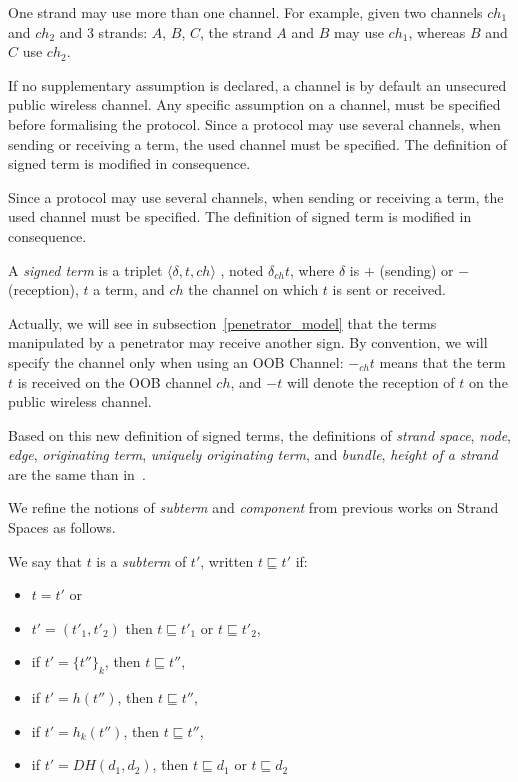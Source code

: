 One strand may use more than one channel.
For example, given two channels $ch_1$ and $ch_2$ and 3 strands: $A$, $B$, $C$, the strand $A$ and $B$ may use $ch_1$, whereas $B$ and $C$ use $ch_2$. 

If no supplementary assumption is declared, a channel is by default an unsecured public wireless channel. Any specific assumption on a channel, must be specified before formalising the protocol. Since a protocol may use several channels, when sending or receiving a term, the used channel must be specified. The definition of signed term is modified in consequence. 

Since a protocol may use several channels, when sending or receiving a term, the used channel must be specified. The definition of signed term is modified in consequence. 

\begin{Definition}
A \emph{signed term} is a triplet $\langle \delta, t, ch  \rangle$ , noted $\delta_{ch} t$, where $\delta$ is $+$ (sending) or $-$ (reception), $t$ a term, and $ch$ the channel on which $t$ is sent or received.
\end{Definition}

Actually, we will see in subsection~\ref{penetrator_model} that the terms manipulated by a penetrator may receive another sign.
By convention, we will specify the channel only when using an OOB Channel: $-_{ch}t$ means that the term $t$ is received on the OOB channel $ch$, and $-t$ will denote the reception of $t$ on the public wireless channel.

Based on this new definition of signed terms, the definitions of \textit{strand space}, \textit{node}, \textit{edge}, \textit{originating term}, \textit{uniquely originating term}, and \textit{bundle}, \textit{height of a strand} are the same than in~\cite{674832}. 

We refine the notions of \textit{subterm} and \textit{component} from previous works on Strand Spaces as follows.

\begin{Definition}[Subterm]
We say that $t$ is a \emph{subterm} of $t'$, written $t \sqsubseteq t'$ if:
\begin{itemize}
\item $t=t'$ or
\item $t'= (t'_1,t'_2)$ then $t \sqsubseteq t'_1$ or $t \sqsubseteq t'_2$,
\item if $t'={\{t''\}}_k$, then $t \sqsubseteq t''$,
\item if $t'=h(t'')$, then $t \sqsubseteq t''$,
\item if $t'=h_k(t'')$, then $t \sqsubseteq t''$,
\item if $t'=DH(d_1,d_2)$, then $t \sqsubseteq d_1$ or $t \sqsubseteq d_2$
\end{itemize}
\end{Definition}

